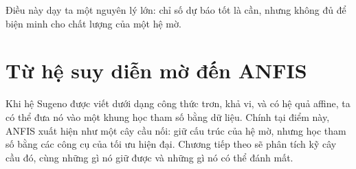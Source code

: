 Điều này dạy ta một nguyên lý lớn: chỉ số dự báo tốt là cần, nhưng không đủ để biện minh cho chất lượng của một hệ mờ.

\section{Từ hệ suy diễn mờ đến ANFIS}

Khi hệ Sugeno được viết dưới dạng công thức trơn, khả vi, và có hệ quả affine, ta có thể đưa nó vào một khung học tham số bằng dữ liệu. Chính tại điểm này, ANFIS xuất hiện như một cây cầu nối: giữ cấu trúc của hệ mờ, nhưng học tham số bằng các công cụ của tối ưu hiện đại. Chương tiếp theo sẽ phân tích kỹ cây cầu đó, cùng những gì nó giữ được và những gì nó có thể đánh mất.
